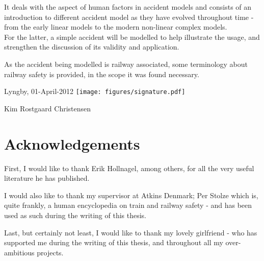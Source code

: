 \documentclass[10pt,oneside]{book}                  %
\def\thesisauthor{Kim Rostgaard Christensen}                     %
\def\thesishandin{01-April}					          %
\def\thesisyear{2012} 							          %
\begin{document}
It deals with the aspect of human factors in accident models and consists of an introduction to different accident model as they have evolved throughout time - from the early linear models to the modern non-linear complex models.\\
For the latter, a simple accident will be modelled to help illustrate the usage, and strengthen the discussion of its validity and application.

As the accident being modelled is railway associated, some terminology about railway safety is provided, in the scope it was found necessary.



\vspace{20mm}
\begin{center}
	\hspace{20mm} Lyngby, \thesishandin-\thesisyear 
	\vspace{5mm}
	\newline
	\texttt{[image: figures/signature.pdf]}
\end{center}
\begin{flushright}
	\thesisauthor
\end{flushright}
\markboth{}{}                                       %

\chapter{Acknowledgements}
First, I would like to thank Erik Hollnagel, among others, for all the very useful literature he has published.

I would also like to thank my supervisor at Atkins Denmark; Per Stolze which is, quite frankly, a human encyclopedia on train and railway safety - and has been used as such during the writing of this thesis.

Last, but certainly not least, I would like to thank my lovely girlfriend - who has supported me during the writing of this thesis, and throughout all my over-ambitious projects.
\end{document}
